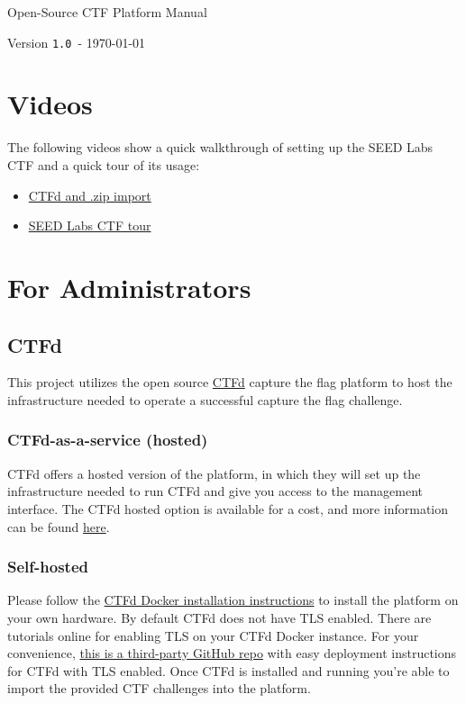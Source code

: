 \documentclass[11pt]{article}
\newcommand{\manVers}{\texttt{1.0}}
\begin{document}
\begin{center}
	{\Huge Open-Source CTF Platform Manual}
	
	{\small Version \manVers\ - \today}
\end{center}

\section{Videos}

The following videos show a quick walkthrough of setting up the SEED Labs CTF and a quick tour of its usage:

\begin{itemize}
	\item \href{run:./videos/SEED_CTF_setup_part1.mp4}{CTFd and .zip import}
	\item \href{run:./videos/SEED_CTF_setup_part2.mp4}{SEED Labs CTF tour}
\end{itemize}

\section{For Administrators}

\subsection{CTFd}

This project utilizes the open source \href{https://ctfd.io/}{CTFd} capture the flag platform to host the infrastructure needed to operate a successful capture the flag challenge.

\subsubsection{CTFd-as-a-service (hosted)}

CTFd offers a hosted version of the platform, in which they will set up the infrastructure needed to run CTFd and give you access to the management interface.
The CTFd hosted option is available for a cost, and more information can be found \href{https://ctfd.io/pricing/}{here}.

\subsubsection{Self-hosted}

Please follow the \href{https://docs.ctfd.io/docs/deployment/installation#docker}{CTFd Docker installation instructions} to install the platform on your own hardware.
By default CTFd does not have TLS enabled.
There are tutorials online for enabling TLS on your CTFd Docker instance.
For your convenience, \href{https://github.com/tghosth/CTFd-docker-deploy}{this is a third-party GitHub repo} with easy deployment instructions for CTFd with TLS enabled.
Once CTFd is installed and running you're able to import the provided CTF challenges into the platform.
\end{document}
